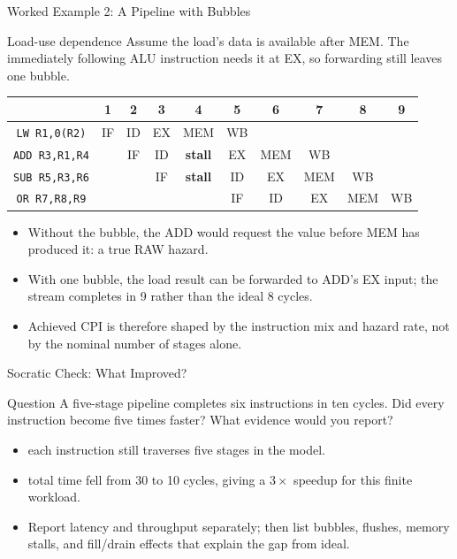 \documentclass[aspectratio=169]{beamer}
\begin{document}
\begin{frame}{Worked Example 2: A Pipeline with Bubbles}
  \scriptsize
  \begin{exampleblock}{Load-use dependence}
    Assume the load's data is available after MEM. The immediately following
    ALU instruction needs it at EX, so forwarding still leaves one bubble.
  \end{exampleblock}
  \begin{center}
    \begin{tabular}{@{}c|ccccccccc@{}}
      \toprule
      & 1 & 2 & 3 & 4 & 5 & 6 & 7 & 8 & 9\\
      \midrule
      \texttt{LW R1,0(R2)} & IF & ID & EX & MEM & WB & & & &\\
      \texttt{ADD R3,R1,R4} & & IF & ID & \textbf{stall} & EX & MEM & WB & &\\
      \texttt{SUB R5,R3,R6} & & & IF & \textbf{stall} & ID & EX & MEM & WB &\\
      \texttt{OR R7,R8,R9} & & & & & IF & ID & EX & MEM & WB\\
      \bottomrule
    \end{tabular}
  \end{center}
  \begin{itemize}
    \item Without the bubble, the ADD would request the value before MEM has
      produced it: a true RAW hazard.
    \item With one bubble, the load result can be forwarded to ADD's EX input;
      the stream completes in 9 rather than the ideal 8 cycles.
    \item Achieved CPI is therefore shaped by the instruction mix and hazard
      rate, not by the nominal number of stages alone.
  \end{itemize}
\end{frame}

\begin{frame}{Socratic Check: What Improved?}
  \begin{alertblock}{Question}
    A five-stage pipeline completes six instructions in ten cycles. Did every
    instruction become five times faster? What evidence would you report?
  \end{alertblock}
  \begin{itemize}
    \item {} each instruction still traverses five stages in the model.
    \item {} total time fell from 30 to 10 cycles,
      giving a $3\times$ speedup for this finite workload.
    \item Report latency and throughput separately; then list bubbles, flushes,
      memory stalls, and fill/drain effects that explain the gap from ideal.
  \end{itemize}
\end{frame}
\end{document}
